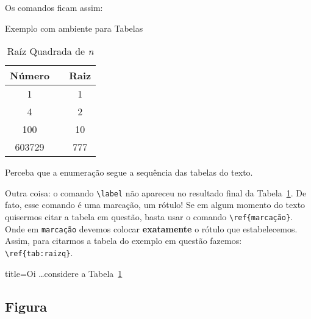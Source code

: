 Os comandos ficam assim:

\begin{codigo}{Exemplo com ambiente para Tabelas}{\lapis}
\begin{table}[!htbp]
  \centering
  \caption{Raíz Quadrada de \textit{n}}
  \label{tab:raizq}
  \begin{tabular}{ccc}
    \toprule
    \textbf{Número}&&\textbf{Raiz}\\
    \midrule
    1 && 1\\
    4 && 2\\
    100 && 10\\
    603729 && 777\\
   \bottomrule
  \end{tabular}
\end{table}
\end{codigo}

Perceba que a enumeração segue a sequência das tabelas do texto.

Outra coisa: o comando \Verb|\label| não apareceu no resultado final da Tabela~\ref{tab:raizq}.
De fato, esse comando é uma marcação, um rótulo!
Se em algum momento do texto quisermos citar a tabela em questão, basta usar o 
comando \Verb|\ref{marcação}|. 
Onde em \texttt{marcação} devemos colocar \textbf{exatamente} o rótulo que 
estabelecemos.
Assim, para citarmos a tabela do exemplo em questão fazemos: \Verb|\ref{tab:raizq}|.

\begin{tcblisting}{title=Oi}
\ldots considere a Tabela~\ref{tab:raizq}
\end{tcblisting}

%
  \subsection{Figura}
%

